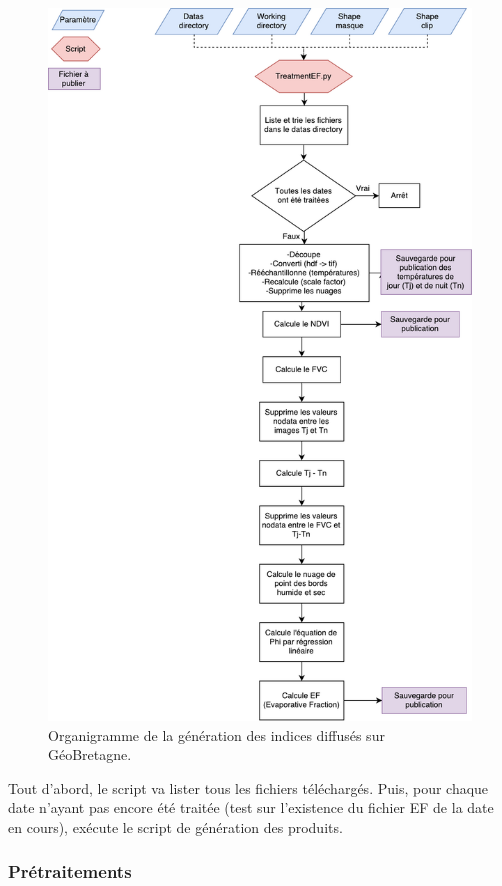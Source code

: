\documentclass[10pt,a4paper]{article}
\begin{document}
\begin{figure}[!h]
\centering
\includegraphics[scale=0.48]{img/orgIndices.pdf}
\caption{Organigramme de la génération des indices diffusés sur GéoBretagne.}
\label{orgIndex}
\end{figure}

Tout d'abord, le script va lister tous les fichiers téléchargés. Puis, pour chaque date n'ayant pas encore été traitée (test sur l'existence du fichier EF de la date en cours), exécute le script de génération des produits.

\subsubsection{Prétraitements}
\end{document}

